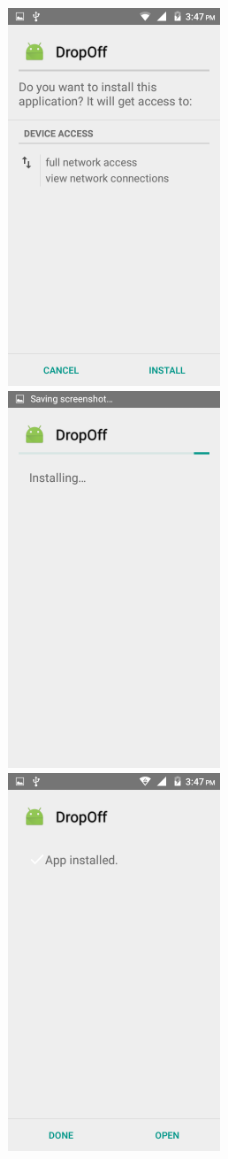 \documentclass[a4paper,12pt]{article}
\begin{document}
			\includegraphics[width=10cm,height=10cm,keepaspectratio]{./Pictures/install1.png}
			\includegraphics[width=10cm,height=10cm,keepaspectratio]{./Pictures/install2.png}
			\includegraphics[width=10cm,height=10cm,keepaspectratio]{./Pictures/install3.png}\\
\end{document}
